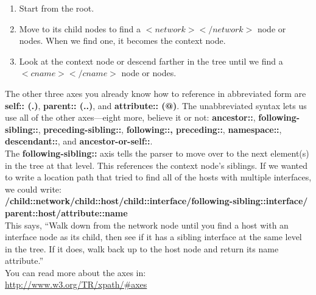 \begin{enumerate}
\item Start from the root.
\item Move to its child nodes to find a $<network></network>$ node or nodes. When we find one, it becomes the context node.
\item Look at the context node or descend farther in the tree until we find a $<cname></cname>$ node or nodes.
\end{enumerate}

The other three axes you already know how to reference in abbreviated form are \textbf{self:: (.)}, \textbf{parent:: (..)}, and \textbf{attribute:: (@)}. The unabbreviated syntax lets us use all of the other axes—eight more, believe it or not: \textbf{ancestor::}, \textbf{following-sibling::}, \textbf{preceding-sibling::}, \textbf{following::, preceding::}, \textbf{namespace::}, \textbf{descendant::}, and \textbf{ancestor-or-self::}.\\

The \textbf{following-sibling::} axis tells the parser to move over to the next element(s) in the tree at that level. This references the context node’s siblings. If we wanted to write a location path that tried to find all of the hosts with multiple interfaces, we could write:\\

\textbf{/child::network/child::host/child::interface/following-sibling::interface/}\\
\textbf{parent::host/attribute::name}\\

This says, “Walk down from the network node until you find a host with an interface node as its child, then see if it has a sibling interface at the same level in the tree. If it does, walk back up to the host node and return its name attribute.”\\

You can read more about the axes in:\\

\url{http://www.w3.org/TR/xpath/#axes}\\




